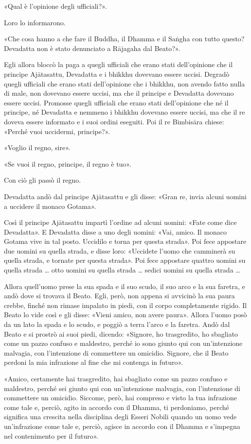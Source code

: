 «Qual è l’opinione degli ufficiali?».

Loro lo informarono.

«Che cosa hanno a che fare il Buddha, il Dhamma e il Saṅgha con tutto questo?
Devadatta non è stato denunciato a Rājagaha dal Beato?».

Egli allora bloccò la paga a quegli ufficiali che erano stati dell’opinione che
il principe Ajātasattu, Devadatta e i bhikkhu dovevano essere uccisi. Degradò
quegli ufficiali che erano stati dell’opinione che i bhikkhu, non avendo fatto
nulla di male, non dovevano essere uccisi, ma che il principe e Devadatta
dovevano essere uccisi. Promosse quegli ufficiali che erano stati dell’opinione
che né il principe, né Devadatta e nemmeno i bhikkhu dovevano essere uccisi, ma
che il re doveva essere informato e i suoi ordini eseguiti. Poi il re Bimbisāra
chiese: «Perché vuoi uccidermi, principe?».

«Voglio il regno, sire».

«Se vuoi il regno, principe, il regno è tuo».

Con ciò gli passò il regno.

Devadatta andò dal principe Ajātasattu e gli disse: «Gran re, invia alcuni
uomini a uccidere il monaco Gotama».

Così il principe Ajātasattu impartì l’ordine ad alcuni uomini: «Fate come dice
Devadatta». E Devadatta disse a uno degli uomini: «Vai, amico. Il monaco Gotama
vive in tal posto. Uccidilo e torna per questa strada». Poi fece appostare due
uomini su quella strada, e disse loro: «Uccidete l’uomo che camminerà su quella
strada, e tornate per questa strada». Poi fece appostare quattro uomini su
quella strada … otto uomini su quella strada … sedici uomini su quella strada …

Allora quell’uomo prese la sua spada e il suo scudo, il suo arco e la sua
faretra, e andò dove si trovava il Beato. Egli, però, non appena si avvicinò la
sua paura crebbe, finché non rimase impalato in piedi, con il corpo
completamente rigido. Il Beato lo vide così e gli disse: «Vieni amico, non avere
paura». Allora l’uomo posò da un lato la spada e lo scudo, e poggiò a terra
l’arco e la faretra. Andò dal Beato e si prostrò ai suoi piedi, dicendo:
«Signore, ho trasgredito, ho sbagliato come un pazzo confuso e maldestro, perché
io sono giunto qui con un’intenzione malvagia, con l’intenzione di commettere un
omicidio. Signore, che il Beato perdoni la mia infrazione al fine che mi
contenga in futuro».

«Amico, certamente hai trasgredito, hai sbagliato come un pazzo confuso e
maldestro, perché sei giunto qui con un’intenzione malvagia, con l’intenzione di
commettere un omicidio. Siccome, però, hai compreso e visto la tua infrazione
come tale e, perciò, agito in accordo con il Dhamma, ti perdoniamo, perché
significa una crescita nella disciplina degli Esseri Nobili quando un uomo vede
un’infrazione come tale e, perciò, agisce in accordo con il Dhamma e s’impegna
nel contenimento per il futuro».

